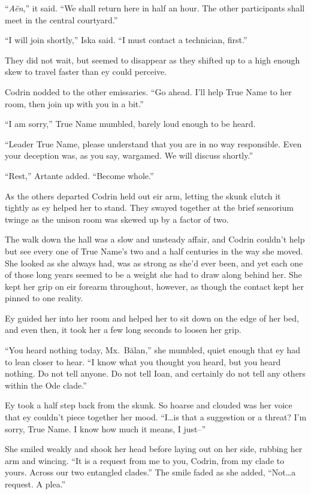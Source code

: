 ``\emph{Aën},'' it said. ``We shall return here in half an hour. The other participants shall meet in the central courtyard.''

``I will join shortly,'' Iska said. ``I must contact a technician, first.''

They did not wait, but seemed to disappear as they shifted up to a high enough skew to travel faster than ey could perceive.

Codrin nodded to the other emissaries. ``Go ahead. I'll help True Name to her room, then join up with you in a bit.''

``I am sorry,'' True Name mumbled, barely loud enough to be heard.

``Leader True Name, please understand that you are in no way responsible. Even your deception was, as you say, wargamed. We will discuss shortly.''

``Rest,'' Artante added. ``Become whole.''

As the others departed Codrin held out eir arm, letting the skunk clutch it tightly as ey helped her to stand. They swayed together at the brief sensorium twinge as the unison room was skewed up by a factor of two.

The walk down the hall was a slow and unsteady affair, and Codrin couldn't help but see every one of True Name's two and a half centuries in the way she moved. She looked as she always had, was as strong as she'd ever been, and yet each one of those long years seemed to be a weight she had to draw along behind her. She kept her grip on eir forearm throughout, however, as though the contact kept her pinned to one reality.

Ey guided her into her room and helped her to sit down on the edge of her bed, and even then, it took her a few long seconds to loosen her grip.

``You heard nothing today, Mx.~Bălan,'' she mumbled, quiet enough that ey had to lean closer to hear. ``I know what you thought you heard, but you heard nothing. Do not tell anyone. Do not tell Ioan, and certainly do not tell any others within the Ode clade.''

Ey took a half step back from the skunk. So hoarse and clouded was her voice that ey couldn't piece together her mood. ``I\ldots is that a suggestion or a threat? I'm sorry, True Name. I know how much it means, I just--''

She smiled weakly and shook her head before laying out on her side, rubbing her arm and wincing. ``It is a request from me to you, Codrin, from my clade to yours. Across our two entangled clades.'' The smile faded as she added, ``Not\ldots a request. A plea.''

